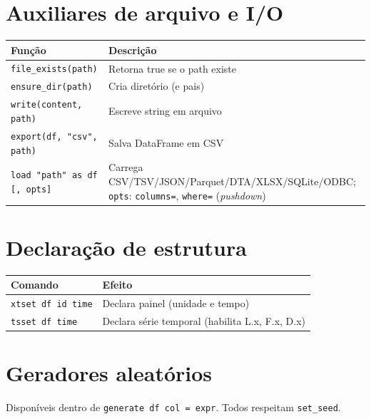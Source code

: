\section{Auxiliares de arquivo e I/O}

\begin{center}
\begin{tabular}{ll}
\toprule
\textbf{Função} & \textbf{Descrição} \\
\midrule
\texttt{file\_exists(path)}       & Retorna true se o path existe \\
\texttt{ensure\_dir(path)}        & Cria diretório (e pais) \\
\texttt{write(content, path)}     & Escreve string em arquivo \\
\texttt{export(df, "csv", path)}   & Salva DataFrame em CSV \\
\texttt{load "path" as df [, opts]} & Carrega CSV/TSV/JSON/Parquet/DTA/XLSX/SQLite/ODBC; \texttt{opts}: \texttt{columns=}, \texttt{where=} (\textit{pushdown}) \\
\bottomrule
\end{tabular}
\end{center}

\section{Declaração de estrutura}

\begin{center}
\begin{tabular}{ll}
\toprule
\textbf{Comando} & \textbf{Efeito} \\
\midrule
\texttt{xtset df id time}  & Declara painel (unidade e tempo) \\
\texttt{tsset df time}     & Declara série temporal (habilita L.x, F.x, D.x) \\
\bottomrule
\end{tabular}
\end{center}

\section{Geradores aleatórios}

Disponíveis dentro de \lstinline{generate df col = expr}. Todos respeitam \lstinline{set_seed}.

